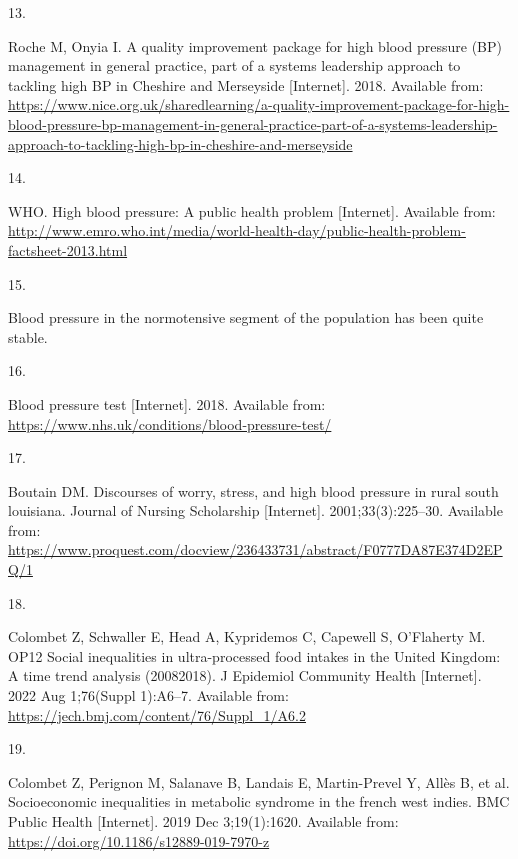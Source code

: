 \documentclass[
]{article}
\newlength{\cslhangindent}
\newlength{\csllabelwidth}
\newlength{\cslentryspacingunit} %
\newenvironment{CSLReferences}[2] %
 {%
  \setlength{\parindent}{0pt}
  \ifodd #1
  \let\oldpar\par
  \def\par{\hangindent=\cslhangindent\oldpar}
  \fi
  \setlength{\parskip}{#2\cslentryspacingunit}
 }%
 {}
\newcommand{\CSLLeftMargin}[1]{\parbox[t]{\csllabelwidth}{#1}}
\newcommand{\CSLRightInline}[1]{\parbox[t]{\linewidth - \csllabelwidth}{#1}\break}
\begin{document}
\begin{CSLReferences}{0}{0}
\leavevmode{}%
\CSLLeftMargin{13. }%
\CSLRightInline{Roche M, Onyia I. A quality improvement package for high
blood pressure (BP) management in general practice, part of a systems
leadership approach to tackling high BP in Cheshire and Merseyside
{[}Internet{]}. 2018. Available from:
\url{https://www.nice.org.uk/sharedlearning/a-quality-improvement-package-for-high-blood-pressure-bp-management-in-general-practice-part-of-a-systems-leadership-approach-to-tackling-high-bp-in-cheshire-and-merseyside}}

\leavevmode{}%
\CSLLeftMargin{14. }%
\CSLRightInline{WHO. High blood pressure: A public health problem
{[}Internet{]}. Available from:
\url{http://www.emro.who.int/media/world-health-day/public-health-problem-factsheet-2013.html}}

\leavevmode{}%
\CSLLeftMargin{15. }%
\CSLRightInline{Blood pressure in the normotensive segment of the
population has been quite stable. }

\leavevmode{}%
\CSLLeftMargin{16. }%
\CSLRightInline{Blood pressure test {[}Internet{]}. 2018. Available
from: \url{https://www.nhs.uk/conditions/blood-pressure-test/}}

\leavevmode{}%
\CSLLeftMargin{17. }%
\CSLRightInline{Boutain DM. Discourses of worry, stress, and high blood
pressure in rural south louisiana. Journal of Nursing Scholarship
{[}Internet{]}. 2001;33(3):225--30. Available from:
\url{https://www.proquest.com/docview/236433731/abstract/F0777DA87E374D2EPQ/1}}

\leavevmode{}%
\CSLLeftMargin{18. }%
\CSLRightInline{Colombet Z, Schwaller E, Head A, Kypridemos C, Capewell
S, O'Flaherty M. OP12 Social inequalities in ultra-processed food
intakes in the United Kingdom: A time trend analysis
(2008{\textendash}2018). J Epidemiol Community Health {[}Internet{]}.
2022 Aug 1;76(Suppl 1):A6--7. Available from:
\url{https://jech.bmj.com/content/76/Suppl_1/A6.2}}

\leavevmode{}%
\CSLLeftMargin{19. }%
\CSLRightInline{Colombet Z, Perignon M, Salanave B, Landais E,
Martin-Prevel Y, Allès B, et al. Socioeconomic inequalities in metabolic
syndrome in the french west indies. BMC Public Health {[}Internet{]}.
2019 Dec 3;19(1):1620. Available from:
\url{https://doi.org/10.1186/s12889-019-7970-z}}


\end{CSLReferences}
\end{document}
